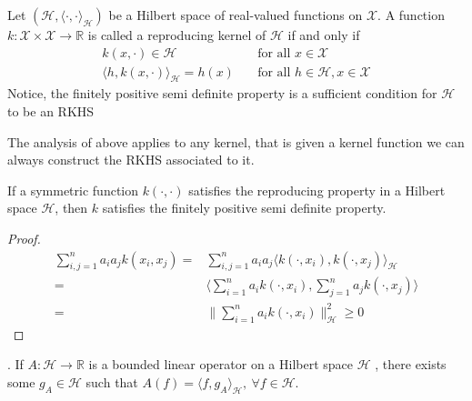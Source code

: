 \begin{definition}
    Let $(\mathcal{H}, \langle \cdot, \cdot \rangle_\mathcal{H})$ be a Hilbert space of real-valued functions on $\mathcal{X}$. A function $k: \mathcal{X} \times \mathcal{X} \to \mathbb{R}$ is called a reproducing kernel of $\mathcal{H}$ if and only if 
     \begin{align}
        k(x, \cdot) \in \mathcal{H} &\quad \text{for all   } x \in \mathcal{X}    \\
        \langle  h, k(x, \cdot) \rangle_\mathcal{H} = h(x) &\quad \text{for all   } h \in \mathcal{H}, x \in \mathcal{X}
    \end{align}
    Notice, the finitely positive semi definite property is a sufficient condition for $\mathcal{H}$ to be an RKHS
\end{definition}

The analysis of above applies to any kernel, that is given a kernel function we can always construct the RKHS associated to it.
\begin{theorem}
    If a symmetric function $k(\cdot, \cdot)$ satisfies the reproducing property in a Hilbert space $\mathcal{H}$, then $k$ satisfies the finitely positive semi definite property.
\end{theorem}

\begin{proof}
    \begin{align}
        \sum\limits_{i,j=1}^n a_i a_j k(x_i, x_j)=& \sum\limits_{i,j=1}^n a_i a_j \langle k(\cdot, x_i), k(\cdot, x_j)\rangle_{\mathcal{H}}
        \\
        =& \langle \sum\limits_{i=1}^n a_i k(\cdot, x_i), \sum\limits_{j=1}^n a_j k(\cdot, x_j) \rangle \\
        =& \| \sum\limits_{i=1}^n a_i k(\cdot, x_i)\|_{\mathcal{H}}^2 \geq 0
    \end{align}
\end{proof}
   


\begin{theorem}
    . If $A : \mathcal{H} \rightarrow \mathbb{R}$ is a bounded linear operator on a Hilbert space $\mathcal{H}$ , there exists some $g_{A} \in \mathcal{H}$ such that $A(f) = \langle f,g_A\rangle_\mathcal{H}, \ \forall f \in \mathcal{H}$.
\end{theorem}

